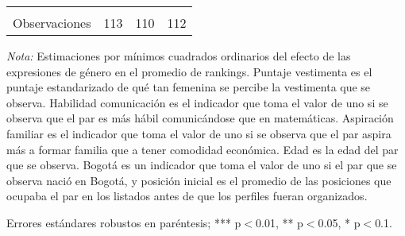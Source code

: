 \begin{table}[ht!]
\begin{threeparttable}
{\begin{tabular}{lccc}
    	                                        &		    &		    &		    \\
    Observaciones	                            &	113	    &	110	    &	112	    \\\hline \hline
    \end{tabular}}
    \begin{tablenotes}
    \footnotesize{
    \item \textit{Nota:} Estimaciones por mínimos cuadrados ordinarios del efecto de las expresiones de género en el promedio de rankings. Puntaje vestimenta es el puntaje estandarizado de qué tan femenina se percibe la vestimenta que se observa. Habilidad comunicación es el indicador que toma el valor de uno si se observa que el par es más hábil comunicándose que en matemáticas. Aspiración familiar es el indicador que toma el valor de uno si se observa que el par aspira más a formar familia que a tener comodidad económica. Edad es la edad del par que se observa. Bogotá es un indicador que toma el valor de uno si el par que se observa nació en Bogotá, y posición inicial es el promedio de las posiciones que ocupaba el par en los listados antes de que los perfiles fueran organizados. 
    \item Errores estándares robustos en paréntesis; *** p$<$0.01, ** p$<$0.05, * p$<$0.1.}
    \end{tablenotes}
    \end{threeparttable}
\end{table}
